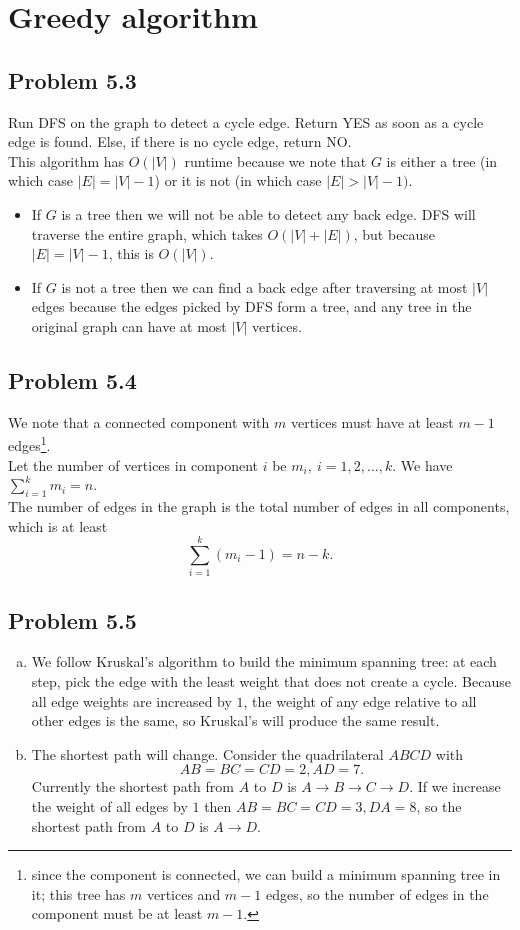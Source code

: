 \documentclass[12pt]{report}
\begin{document}
\chapter[Chapter 5 Solution]{Greedy algorithm}

\section{Problem 5.3}
Run DFS on the graph to detect a cycle edge. Return YES as soon as a cycle edge is found. Else, if there is no cycle edge, return NO.\\
This algorithm has $O(|V|)$ runtime because we note that $G$ is either a tree (in which case $|E| = |V| - 1$) or it is not (in which case $|E| > |V| - 1)$.
\begin{itemize}
  \item If $G$ is a tree then we will not be able to detect any back edge. DFS will traverse the entire graph, which takes $O(|V| + |E|)$, but because $|E| = |V| - 1$, this is $O(|V|)$.
  \item If $G$ is not a tree then we can find a back edge after traversing at most $|V|$ edges because the edges picked by DFS form a tree, and any tree in the original graph can have at most $|V|$ vertices.
\end{itemize}

\section{Problem 5.4}
We note that a connected component with $m$ vertices must have at least $m - 1$ edges\footnote{since the component is connected, we can build a minimum spanning tree in it; this tree has $m$ vertices and $m-1$ edges, so the number of edges in the component must be at least $m-1$.}. \\
Let the number of vertices in component $i$ be $m_i, \ i = 1,2,\ldots,k$. We have $\displaystyle \sum_{i=1}^k m_i = n$.\\
The number of edges in the graph is the total number of edges in all components, which is at least $$\sum_{i=1}^k (m_i - 1) = n - k.$$


\section{Problem 5.5}
\begin{enumerate}[(a)]
  \item We follow Kruskal's algorithm to build the minimum spanning tree: at each step, pick the edge with the least weight that does not create a cycle. Because all edge weights are increased by $1$, the weight of any edge relative to all other edges is the same, so Kruskal's will produce the same result.
  \item The shortest path will change. Consider the quadrilateral $ABCD$ with $$AB = BC = CD = 2, AD = 7.$$ Currently the shortest path from $A$ to $D$ is $A \to B \to C \to D$. If we increase the weight of all edges by $1$ then $AB = BC = CD = 3, DA = 8$, so the shortest path from $A$ to $D$ is $A \to D$.
\end{enumerate}
\end{document}
